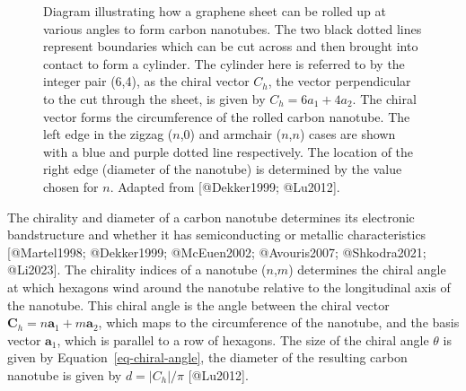\documentclass[
  letterpaper,
  DIV=11,
  numbers=noendperiod]{scrartcl}
\begin{document}
\begin{figure}


\caption{\label{fig-carbon-nanotube-wrapping}Diagram illustrating how a
graphene sheet can be rolled up at various angles to form carbon
nanotubes. The two black dotted lines represent boundaries which can be
cut across and then brought into contact to form a cylinder. The
cylinder here is referred to by the integer pair (6,4), as the chiral
vector \(C_h\), the vector perpendicular to the cut through the sheet,
is given by \(C_h = 6a_1+4a_2\). The chiral vector forms the
circumference of the rolled carbon nanotube. The left edge in the zigzag
(\(n\),0) and armchair (\(n\),\(n\)) cases are shown with a blue and
purple dotted line respectively. The location of the right edge
(diameter of the nanotube) is determined by the value chosen for \(n\).
Adapted from {[}@Dekker1999; @Lu2012{]}.}

\end{figure}%

The chirality and diameter of a carbon nanotube determines its
electronic bandstructure and whether it has semiconducting or metallic
characteristics {[}@Martel1998; @Dekker1999; @McEuen2002; @Avouris2007;
@Shkodra2021; @Li2023{]}. The chirality indices of a nanotube
(\(n\),\(m\)) determines the chiral angle at which hexagons wind around
the nanotube relative to the longitudinal axis of the nanotube. This
chiral angle is the angle between the chiral vector
\(\textbf{C}_h = n\textbf{a}_1+m\textbf{a}_2\), which maps to the
circumference of the nanotube, and the basis vector \(\textbf{a}_1\),
which is parallel to a row of hexagons. The size of the chiral angle
\(\theta\) is given by Equation~\ref{eq-chiral-angle}, the diameter of
the resulting carbon nanotube is given by \(d=|C_h|/\pi\) {[}@Lu2012{]}.
\end{document}
